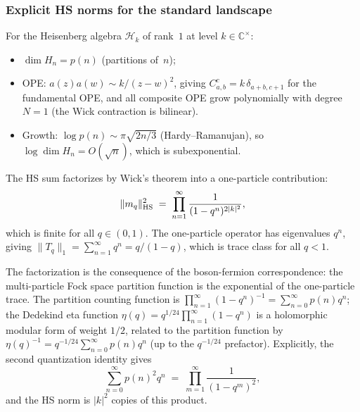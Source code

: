 \subsubsection{Explicit HS norms for the standard landscape}

\begin{computation}
\label{comp:thqg-I-hs-heisenberg}
For the Heisenberg algebra $\mathcal{H}_k$ of rank~$1$ at level $k \in \mathbb{C}^{\times}$:
\begin{itemize}
\item $\dim H_n = p(n)$ (partitions of~$n$);
\item OPE: $a(z)a(w) \sim k/(z-w)^2$, giving $C^c_{a,b} = k\,\delta_{a+b,c+1}$ for the fundamental OPE, and all composite OPE grow polynomially with degree $N = 1$ (the Wick contraction is bilinear).
\item Growth: $\log p(n) \sim \pi\sqrt{2n/3}$ (Hardy--Ramanujan), so $\log \dim H_n = O(\sqrt{n})$, which is subexponential.
\end{itemize}
The HS sum factorizes by Wick's theorem into a one-particle contribution:
\begin{equation}%
\|m_q\|_{\HS}^2 \;=\; \prod_{n=1}^\infty \frac{1}{(1-q^n)^{2|k|^2}},
\end{equation}
which is finite for all $q \in (0,1)$. The one-particle operator has eigenvalues $q^n$, giving $\|T_q\|_1 = \sum_{n=1}^\infty q^n = q/(1-q)$, which is trace class for all $q < 1$.

The factorization is the consequence of the boson-fermion correspondence: the multi-particle Fock space partition function is the exponential of the one-particle trace. The partition counting function is $\prod_{n=1}^\infty (1-q^n)^{-1} = \sum_{n=0}^\infty p(n)q^n$; the Dedekind eta function $\eta(q) = q^{1/24}\prod_{n=1}^\infty (1-q^n)$ is a holomorphic modular form of weight $1/2$, related to the partition function by $\eta(q)^{-1} = q^{-1/24}\sum_{n=0}^\infty p(n)q^n$ (up to the $q^{-1/24}$ prefactor). Explicitly, the second quantization identity gives
\begin{equation}%
\sum_{n=0}^\infty p(n)^2 q^n \;=\; \prod_{m=1}^\infty \frac{1}{(1-q^m)^2},
\end{equation}
and the HS norm is $|k|^2$ copies of this product.
\end{computation}

